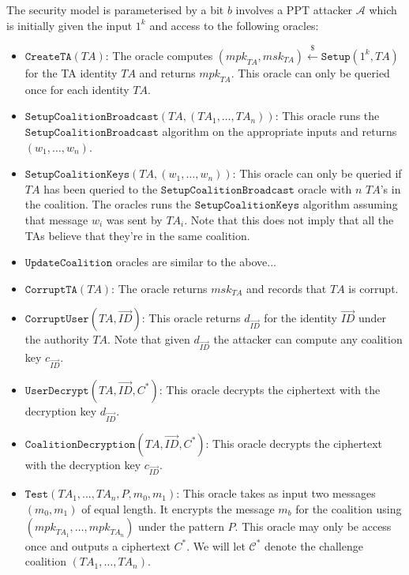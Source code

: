 \documentclass[10pt]{article}
\newcommand{\A}{\mathcal{A}}
\newcommand{\ID}{\mathit{ID}}
\newcommand{\TA}{\mathit{TA}}
\newcommand{\mpk}{\mathit{mpk}}
\newcommand{\msk}{\mathit{msk}}
\newcommand{\getsr}{\stackrel{{\scriptscriptstyle\$}}{\gets}}
\begin{document}
The security model is parameterised by a bit $b$ involves a PPT
attacker $\A$ which is initially given the input $1^k$ and access to
the following oracles:
\begin{itemize}
\item $\texttt{CreateTA}(\TA)$: The oracle computes
$(\mpk_{\TA},\msk_{\TA})\getsr \texttt{Setup}(1^{k},\TA)$ for the TA
identity $\TA$ and returns $\mpk_{\TA}$. This oracle can only be
queried once for each identity $\TA$.\medskip

\item
$\texttt{SetupCoalitionBroadcast}(\TA,(\TA_{1},\ldots,\TA_{n}))$:
This oracle runs the $\texttt{SetupCoalitionBroadcast}$ algorithm on
the appropriate inputs and returns $(w_{1},\ldots,w_{n})$.\medskip

\item $\texttt{SetupCoalitionKeys}(\TA, (w_{1},\ldots,w_{n}))$: This
oracle can only be queried if $\TA$ has been queried to the
$\texttt{SetupCoalitionBroadcast}$ oracle with $n$ $\TA$'s in the
coalition. The oracles runs the $\texttt{SetupCoalitionKeys}$
algorithm assuming that message $w_{i}$ was sent by $\TA_{i}$. Note
that this does not imply that all the TAs believe that they're in
the same coalition.\medskip

\item $\texttt{UpdateCoalition}$ oracles are similar to the
above...\medskip

\item $\texttt{CorruptTA}(\TA)$: The oracle returns $\msk_{\TA}$ and
records that $\TA$ is corrupt.\medskip

\item $\texttt{CorruptUser}(\TA,\vec{\ID})$: This oracle returns
$d_{\vec{\ID}}$ for the identity $\vec{\ID}$ under the authority
$\TA$. Note that given $d_{\vec{\ID}}$ the attacker can compute any
coalition key $c_{\vec{\ID}}$. \medskip

\item $\texttt{UserDecrypt}(\TA,\vec{\ID},C^{*})$: This oracle
decrypts the ciphertext with the decryption key
$d_{\vec{\ID}}$.\medskip

\item $\texttt{CoalitionDecryption}(\TA,\vec{\ID},C^{*})$: This oracle
decrypts the ciphertext with the decryption key
$c_{\vec{\ID}}$.\medskip

\item
$\texttt{Test}(\TA_{1},\ldots,\TA_{n},\mathit{P},m_{0},m_{1})$: This
oracle takes as input two messages $(m_{0},m_{1})$ of equal length.
It encrypts the message $m_{b}$ for the coalition using
$(\mpk_{\TA_{1}},\ldots,\mpk_{\TA_{n}})$ under the pattern
$\mathit{P}$. This oracle may only be access once and outputs a
ciphertext $C^{*}$. We will let $\mathcal{C}^{*}$ denote the
challenge coalition $(\TA_{1},\ldots,\TA_{n})$.
\end{itemize}
\end{document}
